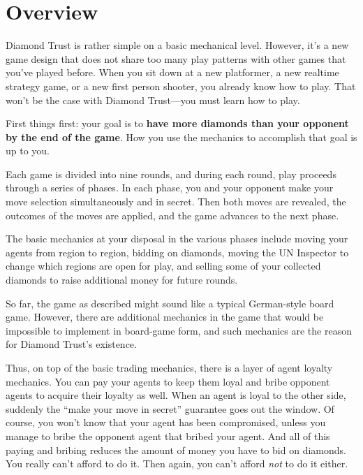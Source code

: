 \documentclass[8pt]{extbook}
\begin{document}
\makeatletter
\renewcommand\@endpart{\standardEndPart}
\makeatother





\section{Overview}
Diamond Trust is rather simple on a basic mechanical level.  However, it's a new game design that does not share too many play patterns with other games that you've played before.  When you sit down at a new platformer, a new realtime strategy game, or a new first person shooter, you already know how to play.  That won't be the case with Diamond Trust---you must learn how to play.

First things first:  your goal is to {\bf have more diamonds than your opponent by the end of the game}.  How you use the mechanics to accomplish that goal is up to you.

Each game is divided into nine rounds, and during each round, play proceeds through a series of phases.  In each phase, you and your opponent make your move selection simultaneously and in secret.  Then both moves are revealed, the outcomes of the moves are applied, and the game advances to the next phase.

The basic mechanics at your disposal in the various phases include moving your agents from region to region, bidding on diamonds, moving the UN Inspector to change which regions are open for play, and selling some of your collected diamonds to raise additional money for future rounds.

So far, the game as described might sound like a typical German-style board game.  However, there are additional mechanics in the game that would be impossible to implement in board-game form, and such mechanics are the reason for Diamond Trust's existence.

Thus, on top of the basic trading mechanics, there is a layer of agent loyalty mechanics.  You can pay your agents to keep them loyal and bribe opponent agents to acquire their loyalty as well.  When an agent is loyal to the other side, suddenly the ``make your move in secret'' guarantee goes out the window.  Of course, you won't know that your agent has been compromised, unless you manage to bribe the opponent agent that bribed your agent.  And all of this paying and bribing reduces the amount of money you have to bid on diamonds.  You really can't afford to do it.  Then again, you can't afford {\it not} to do it either.
\end{document}
